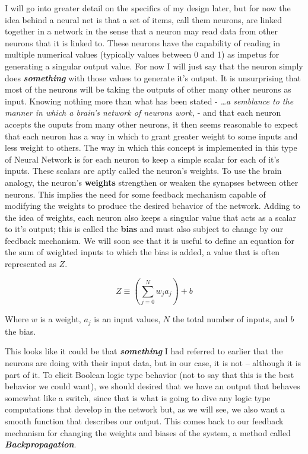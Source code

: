 \documentclass[a4paper,10pt]{article}
\let\oldemph\emph
\renewcommand{\emph}[1]{\textbf{\oldemph{#1}}}
\newcommand{\mathwords}[1]{
	{
		\linespread{.95}
		\begin{adjustwidth}{8em}{8em}
			\footnotesize
			#1 
		\end{adjustwidth}
	}
}
\begin{document}
I will go into greater detail on the specifics of my design later, but for now the idea behind a neural net is
that a set of items, call them neurons, are linked together in a network in the sense that a neuron may read data
from other neurons that it is linked to. These neurons have the capability of reading in multiple numerical values
(typically values between 0 and 1) as impetus for generating a singular output value. For now I will just say that the
neuron simply does \emph{something} with those values to generate it's output. It is unsurprising that most of the
neurons will be taking the outputs of other many other neurons as input. Knowing nothing more than what has been stated
- \textit{\ldots a semblance to the manner in which a brain's network of neurons work,} - and that each neuron accepts
the ouputs from many other neurons, it then seems reasonable to expect that each neuron has a way in which to grant
greater weight to some inputs and less weight to others. The way in which this concept is implemented in this type of
Neural Network is for each neuron to keep a simple scalar for each of it's inputs.  These scalars are aptly called the
neuron's \textmd{weights}.  To use the brain analogy, the neuron's \textbf{weights} strengthen or weaken the synapses
between other neurons.  This implies the need for some feedback mechanism capable of modifying the weights to
produce the desired behavior of the network. Adding to the idea of weights, each neuron also keeps a singular value that
acts as a scalar to it's output; this is called the \textbf{bias} and must also subject to change by our feedback
mechanism.  We will soon see that it is useful to define an equation for the sum of weighted inputs to which the bias is
added, a value that is often represented as $Z$.

\begin{equation}\label{Zval} 
Z \equiv \left( \sum^N_{j=0} w_j a_j \right)   + b
\end{equation}

\mathwords{ Where $w$ is a weight, $a_j$ is an input values, $N$ the total number of inputs, and $b$ the bias.} 

This looks like it could be that \emph{something} I had referred to earlier that the neurons are doing with their input
data, but in our case, it is not -- although it is part of it.  To elicit Boolean logic type behavior (not to say that
this is the best behavior we could want), we should desired that we have an output that behaves somewhat like a switch,
since that is what is going to dive any logic type computations that develop in the network but,  as we will see, we
also want a smooth function that describes our output.  This comes back to our feedback mechanism for changing the
weights and biases of the system, a method called \emph{Backpropagation}.
\end{document}
